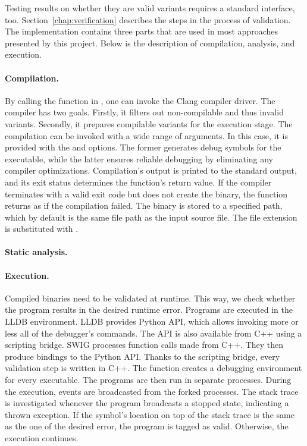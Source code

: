 Testing results on whether they are valid variants requires a standard 
interface, too.
Section~\ref{chap:verification} describes the steps in the process 
of validation.
The implementation contains three parts that are used in most approaches 
presented by this project.
Below is the description of compilation, analysis, and execution.

\paragraph{Compilation.} By calling the  function in 
, one can invoke the Clang compiler driver.
The compiler has two goals.
Firstly, it filters out non-compilable and thus invalid variants.
Secondly, it prepares compilable variants for the execution stage.
The compilation can be invoked with a wide range of arguments.
In this case, it is provided with the  and  options.
The former generates debug symbols for the executable, while the latter 
ensures reliable debugging by eliminating any compiler optimizations.
Compilation's output is printed to the standard output, and its exit status 
determines the function's return value.
If the compiler terminates with a valid exit code but does not create 
the binary, the function returns as if the compilation failed.
The binary is stored to a specified path, which by default is the same file 
path as the input source file.
The file extension is substituted with .

\paragraph{Static analysis.}

\paragraph{Execution.} Compiled binaries need to be validated at runtime.
This way, we check whether the program results in the desired runtime error.
Programs are executed in the LLDB environment.
LLDB provides Python API, which allows invoking more or less all of 
the debugger's commands.
The API is also available from C++ using a scripting bridge.
SWIG processes function calls made from C++.
They then produce bindings to the Python API.
Thanks to the scripting bridge, every validation step is written in C++.
The  function creates a debugging environment for every 
executable.
The programs are then run in separate processes.
During the execution, events are broadcasted from the forked processes.
The stack trace is investigated whenever the program broadcasts a stopped 
state, indicating a thrown exception.
If the symbol's location on top of the stack trace is the same as the one of 
the desired error, the program is tagged as valid.
Otherwise, the execution continues.

